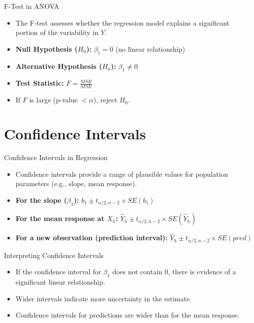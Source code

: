 \documentclass[aspectratio=169]{beamer}
\begin{document}
\begin{frame}{F-Test in ANOVA}
  \begin{itemize}
    \item The F-test assesses whether the regression model explains a significant portion of the variability in $Y$.
    \item \textbf{Null Hypothesis ($H_0$):} $\beta_1 = 0$ (no linear relationship)
    \item \textbf{Alternative Hypothesis ($H_a$):} $\beta_1 \neq 0$
    \item \textbf{Test Statistic:} $F = \frac{MSR}{MSE}$
    \item If $F$ is large (p-value $< \alpha$), reject $H_0$.
  \end{itemize}
\end{frame}

\section{Confidence Intervals}
\begin{frame}{Confidence Intervals in Regression}
  \begin{itemize}
    \item Confidence intervals provide a range of plausible values for population parameters (e.g., slope, mean response).
    \item \textbf{For the slope ($\beta_1$):} $b_1 \pm t_{\alpha/2, n-2} \times SE(b_1)$
    \item \textbf{For the mean response at $X_h$:} $\hat{Y}_h \pm t_{\alpha/2, n-2} \times SE(\hat{Y}_h)$
    \item \textbf{For a new observation (prediction interval):} $\hat{Y}_h \pm t_{\alpha/2, n-2} \times SE(pred)$
  \end{itemize}
\end{frame}

\begin{frame}{Interpreting Confidence Intervals}
  \begin{itemize}
    \item If the confidence interval for $\beta_1$ does not contain 0, there is evidence of a significant linear relationship.
    \item Wider intervals indicate more uncertainty in the estimate.
    \item Confidence intervals for predictions are wider than for the mean response.
  \end{itemize}
\end{frame}
\end{document}
